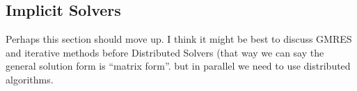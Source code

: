 


\subsection{Implicit Solvers}

Perhaps this section should move up. I think it might be best to discuss GMRES and iterative methods before Distributed Solvers (that way we can say the general solution form is ``matrix form''. but in parallel we need to use distributed algorithms.
